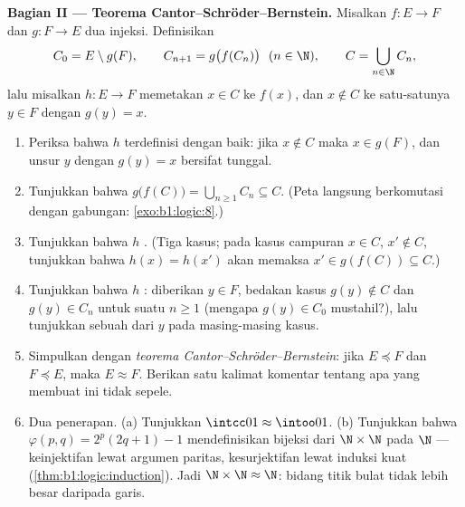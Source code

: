 \begin{problem}
\medskip
\noindent\textbf{Bagian II --- Teorema
Cantor--Schröder--Bernstein.} Misalkan $f \colon E \to F$ dan
$g \colon F \to E$ dua injeksi. Definisikan
\[
C_0 = E \setminus g(F), \qquad C_{n+1} = g\bigl(f(C_n)\bigr)
\ \ (n \in \N), \qquad C = \bigcup_{n \in \N} C_n,
\]
lalu misalkan $h \colon E \to F$ memetakan $x \in C$ ke $f(x)$, dan
$x \notin C$ ke satu-satunya $y \in F$ dengan $g(y) = x$.
\begin{enumerate}[resume]
  \item Periksa bahwa $h$ terdefinisi dengan baik: jika $x \notin C$
        maka $x \in
        g(F)$, dan unsur $y$ dengan $g(y) = x$ bersifat tunggal.
  \item Tunjukkan bahwa $g\bigl(f(C)\bigr) = \bigcup_{n \geq 1} C_n
        \subseteq C$. (Peta langsung berkomutasi dengan gabungan:
        \cref{exo:b1:logic:8}.)
  \item Tunjukkan bahwa $h$ . (Tiga kasus; pada kasus campuran
        $x \in C$, $x' \notin C$, tunjukkan bahwa $h(x) = h(x')$ akan
        memaksa $x' \in g(f(C)) \subseteq C$.)
  \item Tunjukkan bahwa $h$ : diberikan $y \in F$, bedakan
        kasus $g(y) \notin C$ dan $g(y) \in C_n$ untuk suatu $n
        \geq 1$ (mengapa $g(y) \in C_0$ mustahil?), lalu tunjukkan
        sebuah  dari $y$ pada masing-masing kasus.
  \item Simpulkan dengan \emph{teorema
        Cantor--Schröder--Bernstein}: jika $E \preceq F$ dan
        $F \preceq E$, maka $E
        \approx F$. Berikan satu kalimat komentar tentang apa yang
        membuat  ini tidak sepele.
  \item Dua penerapan. (a) Tunjukkan $\intcc01 \approx \intoo01$.
        (b) Tunjukkan bahwa $\varphi(p, q) = 2^p(2q + 1) - 1$
        mendefinisikan bijeksi dari $\N \times \N$ pada $\N$ ---
        keinjektifan lewat argumen paritas, kesurjektifan lewat
        induksi kuat (\cref{thm:b1:logic:induction}). Jadi
        $\N \times \N \approx
        \N$: bidang titik bulat tidak lebih besar daripada
        garis.
\end{enumerate}


\end{problem}
